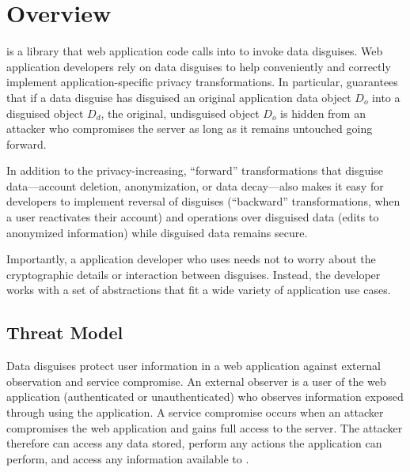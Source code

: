 \section{\sys Overview}
\label{s:overview}

%
\sys is a library that web application code calls into to invoke data disguises.
%
Web application developers rely on data disguises to help conveniently and
correctly implement application-specific privacy transformations.
%
In particular, \sys guarantees that if a data disguise has disguised an original
application data object $D_o$ into a disguised object $D_d$, the original, undisguised
object $D_o$ is hidden from an attacker who compromises the server as long as it remains
untouched going forward.
%

%
In addition to the privacy-increasing, ``forward'' transformations that disguise
data---\eg account deletion, anonymization, or data decay---\sys also makes it easy for
developers to implement reversal of disguises (``backward'' transformations, \eg when a
user reactivates their account) and operations over disguised data (\eg edits to
anonymized information) while disguised data remains secure.
%

%
Importantly, a application developer who uses \sys needs not to worry about the
cryptographic details or interaction between disguises.
%
Instead, the developer works with a set of abstractions that fit a wide
variety of application use cases.
%

\subsection{Threat Model}
\label{s:threat}


%
Data disguises protect user information in a web application against external observation
and service compromise.
%
An external observer is a user of the web application (authenticated or unauthenticated) who
observes information exposed through using the application.
%
A service compromise occurs when an attacker compromises the web application and
gains full access to the server.
%
The attacker therefore can access any data stored, perform any actions the application can
perform, and access any information available to \sys.
%


